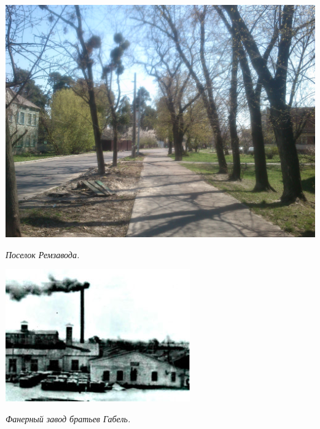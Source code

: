 \begin{center}
\includegraphics[width=\linewidth]{lpix/DSC_0014.JPG}

\textit{Поселок Ремзавода.}
\end{center}


\begin{center}
\includegraphics[width=0.95\linewidth]{lpix/gabel.jpg}

\textit{Фанерный завод братьев Габель.}
\end{center}

